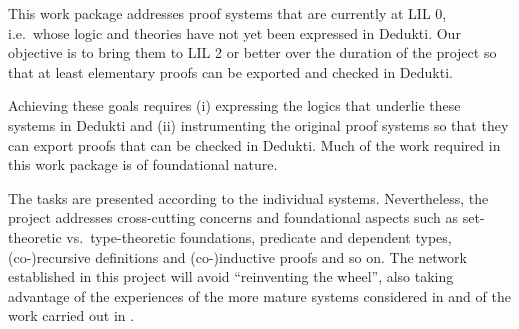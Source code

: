\begin{workpackage}[id=theories,type=RTD,wphases=1-48,
  short=Theories,%
  title= Theories,
  lead=Inn,
  BiaRM=70,
  BirRM=3,
  IasRM=5,
  InnRM=12,
  InrRM=83,
  LeeRM=3,
  LmuRM=16,
  MedRM=4,
  ProRM=11,
  RunRM=7,
  wphases=1-48,
  ]

\begin{wpobjectives}
  This work package addresses proof systems that are currently at LIL 0, i.e.\
  whose logic and theories have not yet been expressed in Dedukti. Our
  objective is to bring them to LIL 2 or better over the duration of the
  project so that at least elementary proofs can be exported and checked in
  Dedukti.

  Achieving these goals requires (i) expressing the logics
  that underlie these systems in Dedukti and
  (ii) instrumenting the original proof systems so that they can export proofs
  that can be checked in Dedukti. Much of the work required in this work package
  is of foundational nature.
\end{wpobjectives}
\begin{wpdescription}
  The tasks are presented according to the individual systems. Nevertheless,
  the project addresses cross-cutting concerns and foundational aspects such
  as set-theoretic vs.\ type-theoretic foundations, predicate and dependent
  types, (co-)recursive definitions and (co-)inductive proofs and so on. The
  network established in this project will avoid ``reinventing the wheel'', also
  taking advantage of the experiences of the more mature systems considered in
  \WPref{instrumentation} and of the work carried out in \WPref{atpetc}.
\end{wpdescription}

\begin{tasklist}
%   


\end{tasklist}
\end{workpackage}
